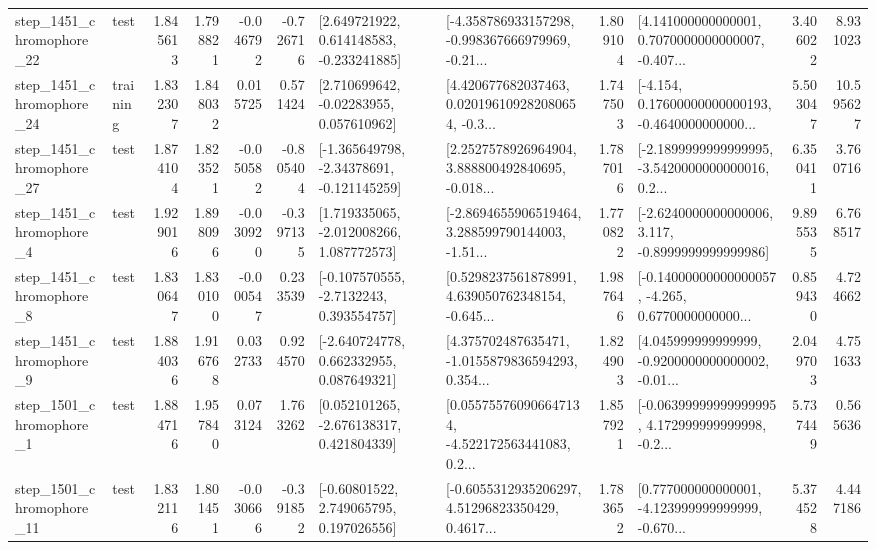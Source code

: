 \begin{tabular}{llrrrrllrlrr}
 step\_1451\_chromophore\_22 &      test &      1.845613 &    1.798821 &     -0.046792 & -0.726716 &    [2.649721922, 0.614148583, -0.233241885] &  [-4.358786933157298, -0.998367666979969, -0.21... &       1.809104 &  [4.141000000000001, 0.7070000000000007, -0.407... &            3.406022 &          8.931023 \\
 step\_1451\_chromophore\_24 &  training &      1.832307 &    1.848032 &      0.015725 &  0.571424 &     [2.710699642, -0.02283955, 0.057610962] &  [4.420677682037463, 0.020196109282080654, -0.3... &       1.747503 &  [-4.154, 0.17600000000000193, -0.4640000000000... &            5.503047 &         10.595627 \\
 step\_1451\_chromophore\_27 &      test &      1.874104 &    1.823521 &     -0.050582 & -0.805404 &   [-1.365649798, -2.34378691, -0.121145259] &  [2.2527578926964904, 3.888800492840695, -0.018... &       1.787016 &  [-2.1899999999999995, -3.5420000000000016, 0.2... &            6.350411 &          3.760716 \\
  step\_1451\_chromophore\_4 &      test &      1.929016 &    1.898096 &     -0.030920 & -0.397135 &    [1.719335065, -2.012008266, 1.087772573] &  [-2.8694655906519464, 3.288599790144003, -1.51... &       1.770822 &  [-2.6240000000000006, 3.117, -0.8999999999999986] &            9.895535 &          6.768517 \\
  step\_1451\_chromophore\_8 &      test &      1.830647 &    1.830100 &     -0.000547 &  0.233539 &     [-0.107570555, -2.7132243, 0.393554757] &  [0.5298237561878991, 4.639050762348154, -0.645... &       1.987646 &  [-0.14000000000000057, -4.265, 0.6770000000000... &            0.859430 &          4.724662 \\
  step\_1451\_chromophore\_9 &      test &      1.884036 &    1.916768 &      0.032733 &  0.924570 &    [-2.640724778, 0.662332955, 0.087649321] &  [4.375702487635471, -1.0155879836594293, 0.354... &       1.824903 &  [4.045999999999999, -0.9200000000000002, -0.01... &            2.049703 &          4.751633 \\
  step\_1501\_chromophore\_1 &      test &      1.884716 &    1.957840 &      0.073124 &  1.763262 &    [0.052101265, -2.676138317, 0.421804339] &  [0.055755760906647134, -4.522172563441083, 0.2... &       1.857921 &  [-0.06399999999999995, 4.172999999999998, -0.2... &            5.737449 &          0.565636 \\
 step\_1501\_chromophore\_11 &      test &      1.832116 &    1.801451 &     -0.030666 & -0.391852 &     [-0.60801522, 2.749065795, 0.197026556] &  [-0.6055312935206297, 4.51296823350429, 0.4617... &       1.783652 &  [0.777000000000001, -4.123999999999999, -0.670... &            5.374528 &          4.447186 \\

\end{tabular}
